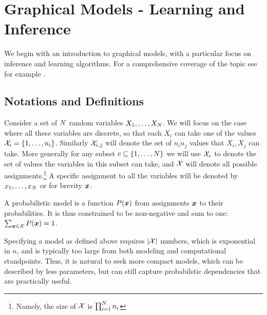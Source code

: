 \section{Graphical Models - Learning and Inference}
We begin with an introduction to graphical models, with a particular focus on inference and learning algorithms. For a comprehensive coverage of the topic see for example .
\subsection{Notations and Definitions}
\label{sec:def}
Consider a set of $N$ random variables $X_1,\ldots,X_{N}$. We will focus on the case where all these variables are discrete,  so that each $X_i$ can take one of the values ${\cal X}_i = \{1,\ldots,n_i\}$. Similarly ${\cal X}_{i,j}$ will denote the set of $n_i n_j$ values that $X_i,X_j$ can take. More generally for any subset $c\subseteq \{1,\ldots,N\}$ we will use ${\cal X}_c$ to denote the set of values the variables in this subset can take, and ${\cal X}$ will denote all possible assignments.\footnote{Namely, the size of ${\cal X}$ is $\prod_{i=1}^{N} n_i$} A specific assignment to all the variables will be denoted by $x_1,\ldots,x_{N}$ or for brevity $\boldsymbol{x}$. 

A probabilistic model is a function $P(\boldsymbol{x})$ from assignments $\boldsymbol{x}$ to their probabilities. It is thus constrained to be non-negative and sum to one: $\sum_{\boldsymbol{x} \in {\cal X}} P(\boldsymbol{x}) = 1$.

Specifying a model as defined above requires $|{\cal X}|$ numbers, which is exponential in $n$, and is typically too large from both modeling and computational standpoints. Thus, it is natural to seek more compact models, which can be described by less parameters, but can still capture probabilstic dependencies that are practically useful.

